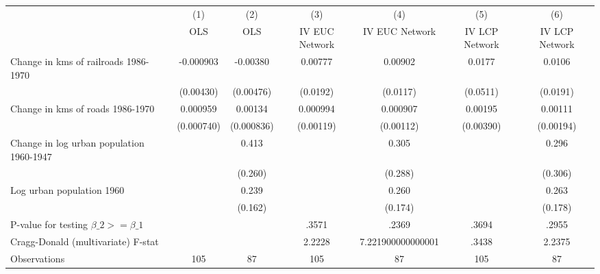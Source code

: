 {
\def\sym#1{\ifmmode^{#1}\else\(^{#1}\)\fi}
\begin{tabular}{l*{6}{c}}
\hline\hline
                &\multicolumn{1}{c}{(1)}&\multicolumn{1}{c}{(2)}&\multicolumn{1}{c}{(3)}&\multicolumn{1}{c}{(4)}&\multicolumn{1}{c}{(5)}&\multicolumn{1}{c}{(6)}\\
                &\multicolumn{1}{c}{OLS}&\multicolumn{1}{c}{OLS}&\multicolumn{1}{c}{IV EUC Network}&\multicolumn{1}{c}{IV EUC Network}&\multicolumn{1}{c}{IV LCP Network}&\multicolumn{1}{c}{IV LCP Network}\\
\hline
Change in kms of railroads 1986-1970&-0.000903         & -0.00380         &  0.00777         &  0.00902         &   0.0177         &   0.0106         \\
                &(0.00430)         &(0.00476)         & (0.0192)         & (0.0117)         & (0.0511)         & (0.0191)         \\
[1em]
Change in kms of roads 1986-1970& 0.000959         &  0.00134         & 0.000994         & 0.000907         &  0.00195         &  0.00111         \\
                &(0.000740)         &(0.000836)         &(0.00119)         &(0.00112)         &(0.00390)         &(0.00194)         \\
[1em]
Change in log urban population 1960-1947&                  &    0.413         &                  &    0.305         &                  &    0.296         \\
                &                  &  (0.260)         &                  &  (0.288)         &                  &  (0.306)         \\
[1em]
Log urban population 1960&                  &    0.239         &                  &    0.260         &                  &    0.263         \\
                &                  &  (0.162)         &                  &  (0.174)         &                  &  (0.178)         \\
\hline
P-value for testing $\beta\_{2} >= \beta\_{1}$&                  &                  &    .3571         &    .2369         &    .3694         &    .2955         \\
Cragg-Donald (multivariate) F-stat&                  &                  &   2.2228         &7.221900000000001         &    .3438         &   2.2375         \\
Observations    &      105         &       87         &      105         &       87         &      105         &       87         \\
\hline\hline
\end{tabular}
}
